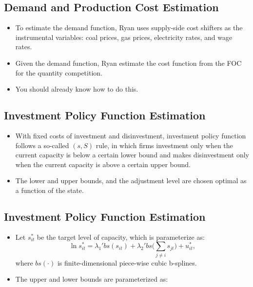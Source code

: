 \documentclass[
]{book}
\providecommand{\tightlist}{%
  \setlength{\itemsep}{0pt}\setlength{\parskip}{0pt}}
\begin{document}
\hypertarget{demand-and-production-cost-estimation}{%
\subsection{Demand and Production Cost Estimation}\label{demand-and-production-cost-estimation}}

\begin{itemize}
\tightlist
\item
  To estimate the demand function, Ryan uses supply-side cost shifters as the instrumental variables: coal prices, gas prices, electricity rates, and wage rates.
\item
  Given the demand function, Ryan estimate the cost function from the FOC for the quantity competition.
\item
  You should already know how to do this.
\end{itemize}

\hypertarget{investment-policy-function-estimation}{%
\subsection{Investment Policy Function Estimation}\label{investment-policy-function-estimation}}

\begin{itemize}
\tightlist
\item
  With fixed costs of investment and disinvestment, investment policy function follows a so-called \((s, S)\) rule, in which firms investment only when the current capacity is below a certain lower bound and makes disinvestment only when the current capacity is above a certain upper bound.
\item
  The lower and upper bounds, and the adjustment level are chosen optimal as a function of the state.
\end{itemize}

\hypertarget{investment-policy-function-estimation-1}{%
\subsection{Investment Policy Function Estimation}\label{investment-policy-function-estimation-1}}

\begin{itemize}
\tightlist
\item
  Let \(s_{it}^*\) be the target level of capacity, which is parameterize as:
  \begin{equation}
  \ln s_{it}^* = \lambda_1' bs(s_{it}) + \lambda_2' bs \Bigg(\sum_{j \neq i} s_{jt}\Bigg) + u_{it}^*,
  \end{equation}
  where \(bs(\cdot)\) is finite-dimensional piece-wise cubic b-splines.
\item
  The upper and lower bounds are parameterized as:
\end{itemize}
\end{document}
